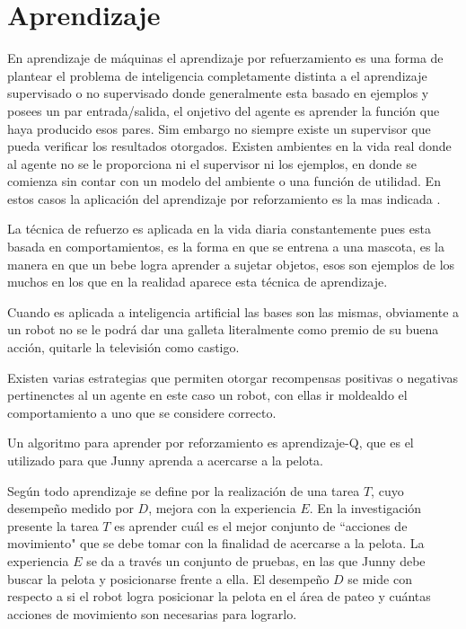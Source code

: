 
\section{Aprendizaje}\label{aprendizaje}
En aprendizaje de m\'aquinas el aprendizaje por refuerzamiento es una forma de plantear el problema de inteligencia completamente distinta a el aprendizaje supervisado o no supervisado donde generalmente esta basado en ejemplos y posees un par entrada/salida, el onjetivo del agente es aprender la funci\'on que haya producido esos pares. Sim embargo no siempre existe un supervisor que pueda verificar los resultados otorgados.
Existen ambientes en la vida real donde al agente no se le proporciona ni el supervisor ni los ejemplos, en donde se comienza sin contar con un modelo del ambiente o una funci\'on de utilidad. En estos casos la aplicaci\'on del aprendizaje por reforzamiento es la mas indicada \cite{peterAndNorvig}.

La t\'ecnica de refuerzo es aplicada en la vida diaria constantemente pues esta basada en comportamientos, es la forma en que se entrena a una mascota, es la manera en que un bebe logra aprender a sujetar objetos, esos son ejemplos de los muchos en los que en la realidad aparece esta t\'ecnica de aprendizaje.

Cuando es aplicada a inteligencia artificial las bases son las mismas, obviamente a un robot no se le podr\'a dar una galleta literalmente como premio de su buena acci\'on, quitarle la televisi\'on como castigo.
 
Existen varias estrategias que permiten otorgar recompensas positivas o negativas pertinenctes al un agente en este caso un robot, con ellas ir moldealdo el comportamiento a uno que se considere correcto.

Un algoritmo para aprender por reforzamiento es aprendizaje-Q, que es el utilizado para que Junny aprenda a acercarse a la pelota.
 


Según \cite{Mitchell} todo aprendizaje se define por la realización de una tarea $T$, cuyo desempeño medido por $D$, mejora con la experiencia $E$. En la investigación presente la tarea $T$ es aprender cuál es el mejor conjunto de ``acciones de movimiento" que se debe tomar con la finalidad de acercarse a la pelota. La experiencia $E$ se da a través un conjunto de pruebas, en las que Junny debe buscar la pelota y posicionarse frente a ella. El desempeño $D$ se mide con respecto a si el robot logra posicionar la pelota en el área de pateo y cuántas acciones de movimiento son necesarias para lograrlo.

